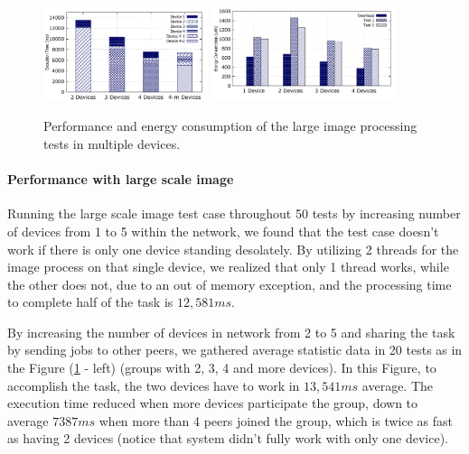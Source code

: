 \documentclass{sig-alternate}[10pt]
\begin{document}
\begin{figure}
	\centering
		\includegraphics[width=0.43\textwidth]{data/img_perf.pdf}
		\includegraphics[width=0.48\textwidth]{data/img_energy.pdf}
	\caption{Performance and energy consumption of the large image processing tests in multiple devices.}
	\label{fig:cluster_performance}
\end{figure}

\paragraph{Performance with large scale image}
Running the large scale image test case throughout 50 tests by increasing number of devices from 1 to 5 within the network, we found that the test case doesn't work if there is only one device standing desolately. By utilizing 2 threads for the image process on that single device, we realized that only 1 thread works, while the other does not, due to an out of memory exception, and the processing time to complete half of the task is $12,581ms$. 

By increasing the number of devices in network from 2 to 5 and sharing the task by sending jobs to other peers, we gathered average statistic data in 20 tests as in the Figure (\ref{fig:cluster_performance} - left) (groups with 2, 3, 4 and more devices). In this Figure, to accomplish the task, the two devices have to work in $13,541ms$ average. The execution time reduced when more devices participate the group, down to average $7387ms$ when more than 4 peers joined the group, which is twice as fast as having 2 devices (notice that system didn't fully work with only one device).
\end{document}

